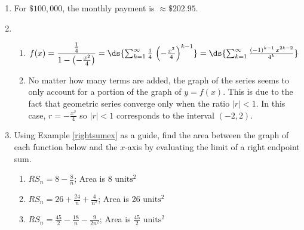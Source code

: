 \documentclass{ximera}
\begin{document}
\begin{enumerate}
\setcounter{enumi}{\value{HW}}

\item  For $\$100,\!000$, the monthly payment is $\approx \$202.95$.

\item  \begin{enumerate} \addtocounter{enumii}{1}  \item $f(x) = \dfrac{\frac{1}{4}}{1 - \left( -\frac{x^2}{4} \right)} = \ds{\sum_{k=1}^{\infty} \frac{1}{4} \,\left( -\frac{x^2}{4} \right)^{k-1}} = \ds{\sum_{k=1}^{\infty} \frac{(-1)^{k-1} \, x^{2k-2}}{4^{k}}} $
\item  No matter how many terms are added, the graph of the series seems to only account for a portion of the graph of $y = f(x)$.  This is due to the fact that geometric series converge only when the ratio $|r| < 1$.  In this case, $r =  -\frac{x^2}{4}$ so $|r| < 1$ corresponds to the interval $(-2,2)$.

\end{enumerate}

\item  Using Example \ref{rightsumex} as a guide, find the area between the graph of each function below and the $x$-axis by evaluating the limit of a right endpoint sum.



\begin{enumerate}

\item  $RS_{n} = 8 - \frac{8}{n}$;  Area is 8 $\text{units}^2$

\item    $RS_{n} = 26 + \frac{24}{n} + \frac{4}{n^2}$;  Area is 26 $\text{units}^2$

\item  $RS_{n} = \frac{45}{2}  - \frac{18}{n} - \frac{9}{2n^2}$;     Area is $\frac{45}{2}$  $\text{units}^2$


\end{enumerate}



\end{enumerate}
\end{document}
